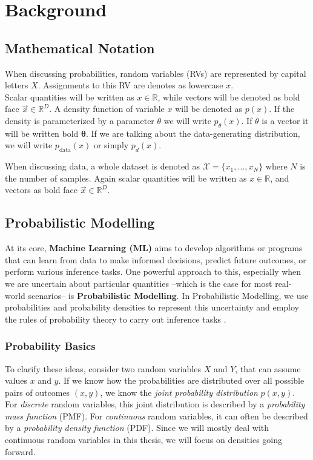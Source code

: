 \chapter{Background}
\label{cha:background}

\section{Mathematical Notation}

When discussing probabilities, random variables (RVs) are represented by capital letters $X$. Assignments to this RV are denotes as lowercase $x$. \\ 
Scalar quantities will be written as $x \in \mathbb{R}$, while vectors will be denoted as bold face $\vec x \in \mathbb{R}^D$.
A density function of variable $x$ will be denoted as $p(x)$. If the density is parameterized by a parameter $\theta$ we will write 
$p_\theta(x)$. If $\theta$ is a vector it will be written bold $\boldsymbol{\theta}$.
If we are talking about the data-generating distribution, we will write $p_{\text{data}}(x)$ or simply $p_d(x)$.

When discussing data, a whole dataset is denoted as $\mathcal{X} = \{x_1, ... , x_N\}$ where $N$ is the number of samples. 
Again scalar quantities will be written as $x \in \mathbb{R}$, and vectors as bold face $\vec x \in \mathbb{R}^D$.

\section{Probabilistic Modelling}
\label{sec:pm}

At its core, \textbf{Machine Learning (ML)} aims to develop algorithms or programs that can learn from data to make informed decisions, predict future outcomes, or perform various inference tasks. 
One powerful approach to this, especially when we are uncertain about particular quantities
--which is the case for most real-world scenarios-- is \textbf{Probabilistic Modelling}.
In Probabilistic Modelling, we use probabilities and probability densities to represent this uncertainty and employ the rules of probability theory to carry out inference tasks \cite{pc_intro}.

\subsection{Probability Basics}
\label{sec:prob_basics}

To clarify these ideas, consider two random variables $X$ and $Y$, that can assume values $x$ and $y$. 
If we know how the probabilities are distributed over all possible pairs of outcomes $(x, y)$, we know the \textit{joint probability distribution} $p(x, y)$.
For \textit{discrete} random variables, this joint distribution is described by a \textit{probability mass function} (PMF). 
For \textit{continuous} random variables, it can often be described by a \textit{probability density function} (PDF).
Since we will mostly deal with continuous random variables in this thesis, we will focus on densities going forward.

